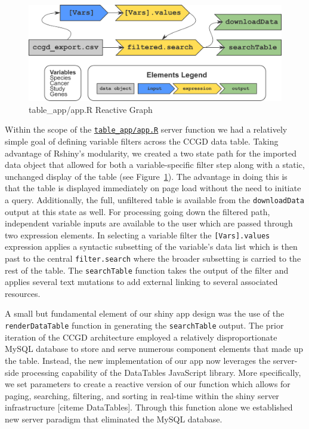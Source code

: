\documentclass[10pt]{report}
\begin{document}
\begin{figure}[H]
    \centering
    \includegraphics[width=\textwidth]{fig/reactive_graph.png}
    \caption{table\_app/app.R Reactive Graph}\label{fig:reactiveGraph}
\end{figure}

Within the scope of the \href{https://github.com/ctastad/ccgd/blob/master/table_app/app.R}{\texttt{table\_app/app.R}} server function we had a relatively simple goal of defining variable filters across the CCGD data table. Taking advantage of Rshiny's modularity, we created a two state path for the imported data object that allowed for both a variable-specific filter step along with a static, unchanged display of the table (see Figure~\ref{fig:reactiveGraph}). The advantage in doing this is that the table is displayed immediately on page load without the need to initiate a query. Additionally, the full, unfiltered table is available from the \texttt{downloadData} output at this state as well. For processing going down the filtered path, independent variable inputs are available to the user which are passed through two expression elements. In selecting a variable filter the \texttt{[Vars].values} expression applies a syntactic subsetting of the variable's data list which is then past to the central \texttt{filter.search} where the broader subsetting is carried to the rest of the table. The \texttt{searchTable} function takes the output of the filter and applies several text mutations to add external linking to several associated resources.

A small but fundamental element of our shiny app design was the use of the \texttt{renderDataTable} function in generating the \texttt{searchTable} output. The prior iteration of the CCGD architecture employed a relatively disproportionate MySQL database to store and serve numerous component elements that made up the table. Instead, the new implementation of our app now leverages the server-side processing capability of the DataTables JavaScript library. More specifically, we set parameters to create a reactive version of our function which allows for paging, searching, filtering, and sorting in real-time within the shiny server infrastructure [citeme DataTables]. Through this function alone we established new server paradigm that eliminated the MySQL database.
\end{document}
